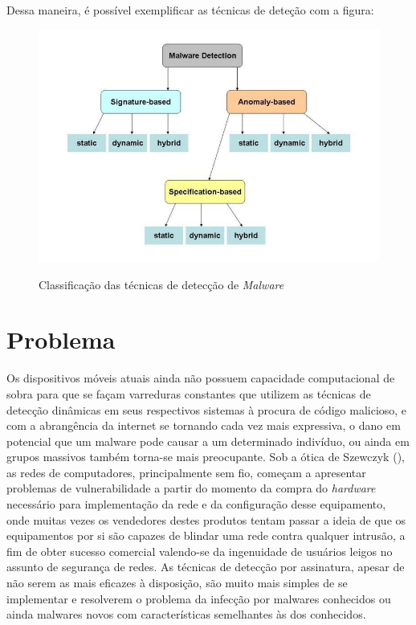 Dessa maneira, é possível exemplificar as técnicas de deteção com a figura:

\begin{figure}[h]
\caption{\small Classificação das técnicas de detecção de \textit{Malware}}
\centering
\includegraphics[scale=0.8]{figs/fig1}
\label{f.metodos_deteccao_01}
\end{figure}

\chapter{Problema}
\label{c.problema}

Os dispositivos móveis atuais ainda não possuem capacidade computacional de
sobra para que se façam varreduras constantes que utilizem as técnicas de
detecção dinâmicas em seus respectivos sistemas à procura de código malicioso,
e com a abrangência da internet se tornando cada vez mais expressiva, o dano
em potencial que um malware pode causar a um determinado indivíduo, ou ainda
em grupos massivos também torna-se mais preocupante. Sob a ótica de Szewczyk
(\citeyear{szewczyk12}), as redes de computadores, principalmente sem fio, começam a apresentar
problemas de vulnerabilidade a partir do momento da compra do \textit{hardware}
necessário para implementação da rede e da configuração desse equipamento,
onde muitas vezes os vendedores destes produtos tentam passar a ideia de que
os equipamentos por si são capazes de blindar uma rede contra qualquer
intrusão, a fim de obter sucesso comercial valendo-se da ingenuidade de
usuários leigos no assunto de segurança de redes. As técnicas de detecção por
assinatura, apesar de não serem as mais eficazes à disposição, são muito mais
simples de se implementar e resolverem o problema da infecção por malwares
conhecidos ou ainda malwares novos com características semelhantes às dos
conhecidos.




